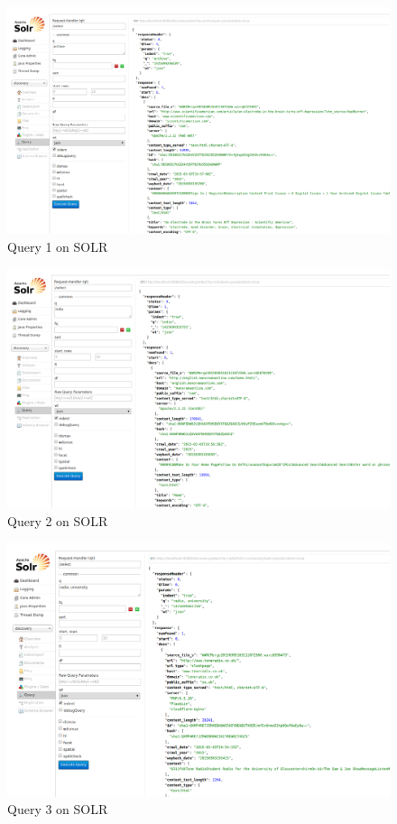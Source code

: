 \begin{figure}[ht]
	\begin{center}
		\includegraphics[scale=0.40]{query1.png}
		\caption{Query 1 on SOLR}
		\end{center}
\end{figure}	
\begin{figure}[ht]
	\begin{center}
		\includegraphics[scale=0.40]{query2.png}
		\caption{Query 2 on SOLR}
		\end{center}
\end{figure}
\begin{figure}[ht]
	\begin{center}
		\includegraphics[scale=0.40]{query3.png}
		\caption{Query 3 on SOLR}
		\end{center}
\end{figure}
\newpage
